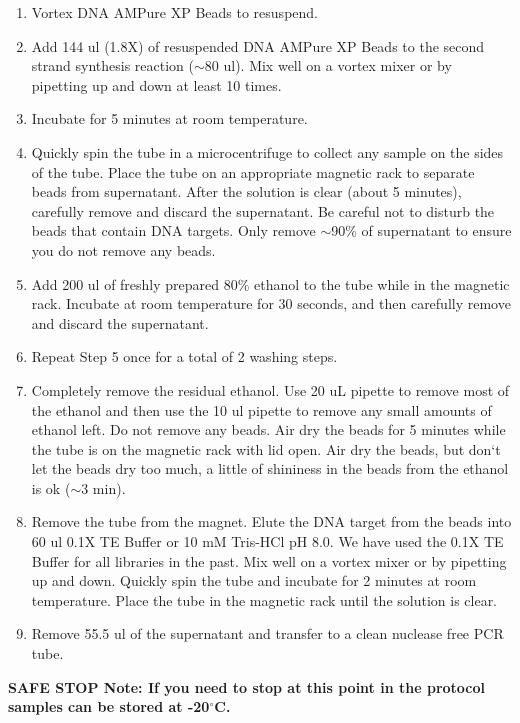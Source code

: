 \documentclass[11pt, oneside]{article}
\begin{document}
		\begin{enumerate}
			\item Vortex DNA AMPure XP Beads to resuspend. 
			\item Add 144 ul (1.8X) of resuspended DNA AMPure XP Beads to the second strand synthesis reaction ($\sim$80 ul). Mix well on a vortex 			mixer or by pipetting up and down at least 10 times.
			\item Incubate for 5 minutes at room temperature. 
			\item Quickly spin the tube in a microcentrifuge to collect any sample on the sides of the tube. Place the tube on an appropriate magnetic rack 			to separate beads from supernatant. After the solution is clear (about 5 minutes), carefully remove and discard the supernatant. Be careful not 			to disturb the beads that contain DNA targets. Only remove $\sim$90\% of supernatant to ensure you do not remove any beads.
			\item Add 200 ul of freshly prepared 80\% ethanol to the tube while in the magnetic rack. Incubate at room temperature for 30 seconds, and 			then carefully remove and discard the supernatant. 
			\item Repeat Step 5 once for a total of 2 washing steps. 
			\item Completely remove the residual ethanol. Use 20 uL pipette to remove most of the ethanol and then use the 10 ul pipette to remove any 			small amounts of ethanol left. Do not remove any beads. Air dry the beads for 5 minutes while the tube is on the magnetic rack with lid open. 			Air dry the beads, but don`t let the beads dry too much, a little of shininess in the beads from the ethanol is ok ($\sim$3 min).  
			\item Remove the tube from the magnet. Elute the DNA target from the beads into 60 ul 0.1X TE Buffer or 10 mM Tris-HCl pH 8.0. We have 			used the 0.1X TE Buffer for all libraries in the past. Mix well on a vortex mixer or by pipetting up and down. Quickly spin the tube and incubate 			for 2 minutes at room temperature. Place the tube in the magnetic rack until the solution is clear. 
			\item Remove 55.5 ul of the supernatant and transfer to a clean nuclease free PCR tube. 
		\end{enumerate}

		\vspace{3mm}
		
		 {\bf SAFE STOP Note: If you need to stop at this point in the protocol samples can be stored at 			-20$^{\circ}$C.}
\end{document}
